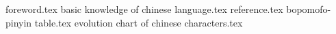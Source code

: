 \frontmatter\frontmatterpreset
{foreword.tex}
\newpage
\setcounter{tocdepth}{2}
\tableofcontents
\mainmatter\mainmatterpreset
{basic knowledge of chinese language.tex}
\appendix\appendixpreset
{reference.tex}
{bopomofo-pinyin table.tex}
{evolution chart of chinese characters.tex}
